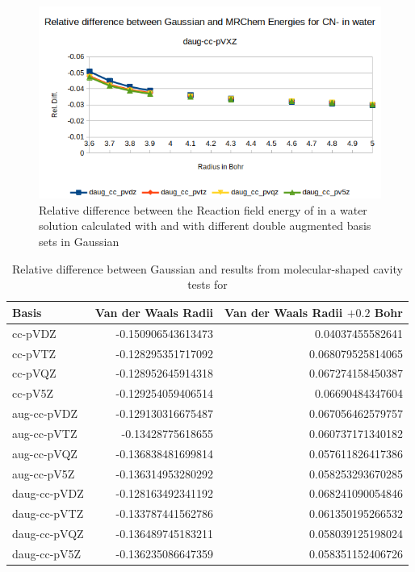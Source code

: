 \documentclass[../master_thesis.tex]{subfiles}
\begin{document}
\begin{figure}[!htb]
  \centering
    \includegraphics[width=\linewidth]{img/cyandaugreldiff.png}
  \caption[Relative difference between  and double augmented Gaussian results]{Relative difference between the Reaction field energy of  in a water solution calculated with \mrchem
  and with different double augmented basis sets in Gaussian}
  \label{fig:cyanreldiffdaug}
\end{figure}


\begin{table}[htbp]
\caption[Relative difference between Gaussian and \mrchem results for ]{Relative difference between Gaussian and \mrchem results from molecular-shaped cavity  tests for }
\begin{tabular}{l|r|r}
Basis & \multicolumn{1}{l|}{Van der Waals Radii} & \multicolumn{1}{l|}{Van der Waals Radii $+ 0.2$ Bohr} \\ \hline
cc-pVDZ & -0.150906543613473 & 0.04037455582641 \\
cc-pVTZ & -0.128295351717092 & 0.068079525814065 \\
cc-pVQZ & -0.128952645914318 & 0.067274158450387 \\
cc-pV5Z & -0.129254059406514 & 0.06690484347604 \\
aug-cc-pVDZ & -0.129130316675487 & 0.067056462579757 \\
aug-cc-pVTZ & -0.13428775618655 & 0.060737171340182 \\
aug-cc-pVQZ & -0.136838481699814 & 0.057611826417386 \\
aug-cc-pV5Z & -0.136314953280292 & 0.058253293670285 \\
daug-cc-pVDZ & -0.128163492341192 & 0.068241090054846 \\
daug-cc-pVTZ & -0.133787441562786 & 0.061350195266532 \\
daug-cc-pVQZ & -0.136489745183211 & 0.058039125198024 \\
daug-cc-pV5Z & -0.136235086647359 & 0.058351152406726 \\
\end{tabular}
\label{tab:watabcreldiff}
\end{table}
\end{document}
